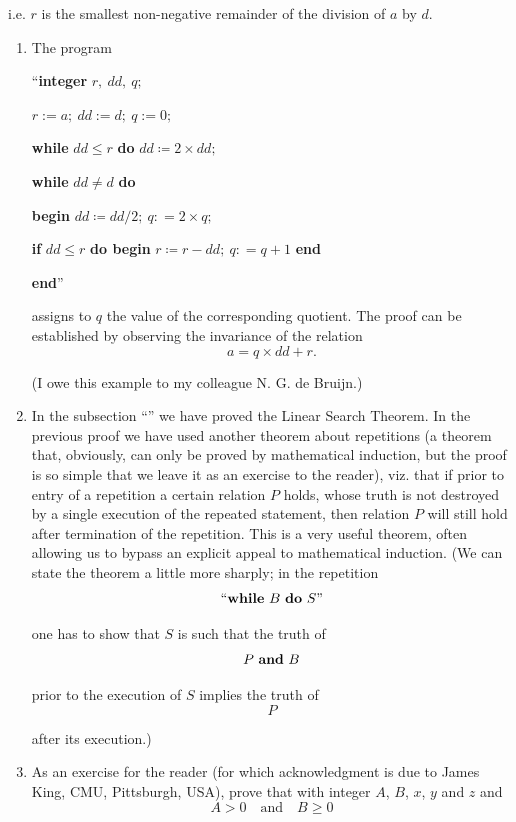 \documentclass[twoside,11pt]{book}
\begin{document}
\noindent
i.e. $r$ is the smallest non-negative remainder of the division of $a$ by $d$.

\begin{enumerate}[wide, nosep, label=\textit{Remark }\arabic*.]
	\item The program
	
	{
		\setlength{\parindent}{8em}
		\hspace{-.4em}``\textbf{integer} $r,\ dd,\ q;$
		
		$r:= a;\ dd:= d;\ q:= 0;$
		
		\textbf{while} $dd \leqslant r$ \textbf{do} $dd \coloneq 2 \times dd;$
		
		\textbf{while} $dd \neq d$ \textbf{do}
		
		\quad\textbf{begin} $dd \coloneq dd/2;\ q: = 2 \times q;$
		
		\quad\quad\textbf{if} $dd \leqslant r$ \textbf{do begin} $r \coloneq r - dd;\ q: = q + 1$ \textbf{end}
		
		\quad\textbf{end}''
	}
	
\noindent
assigns to $q$ the value of the corresponding quotient. The proof can be established by observing the invariance of the relation
	$$
	a= q \times dd + r.
	$$
	
	(I owe this example to my colleague N. G. de Bruijn.)

	\item In the subsection ``'' we have proved the Linear Search Theorem. In the previous proof we have used another theorem about repetitions (a theorem that, obviously, can only be proved by mathematical induction, but the proof is so simple that we leave it as an exercise to the reader), viz. that if prior to entry of a repetition a certain relation $P$ holds, whose truth is not destroyed by a single execution of the repeated statement, then relation $P$ will still hold after termination of the repetition. This is a very useful theorem, often allowing us to bypass an explicit appeal to mathematical induction. (We can state the theorem a little more sharply; in the repetition
	$$
		\text{``\textbf{while} } B \text{ \textbf{do} } S\text{''}
	$$	
	
	\noindent
	one has to show that $S$ is such that the truth of
	$$
	P \text{ \textbf{and} } B
	$$
	
	\noindent
	prior to the execution of $S$ implies the truth of
	$$ P $$
	
	\noindent
	after its execution.)
	\item As an exercise for the reader (for which acknowledgment is due to James King, CMU, Pittsburgh, USA), prove that with integer $A$, $B$, $x$, $y$ and $z$ and
	$$
	A > 0\quad \text{and}\quad B\geqslant 0
	$$
	

\end{enumerate}
\end{document}
